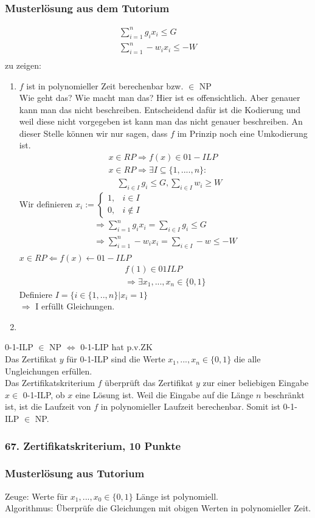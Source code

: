 \documentclass[ngerman,a4paper]{report}
\begin{document}
\subsubsection*{Musterlösung aus dem Tutorium}
\begin{align*}
\sum_{i=1}^n g_ix_i \leq G\\
\sum_{i=1}^n -w_ix_i \leq -W\\
\end{align*}
zu zeigen:
\begin{enumerate}
\item $f$ ist in polynomieller Zeit berechenbar bzw. $\in$ NP\\
Wie geht das? Wie macht man das? Hier ist es offensichtlich. Aber genauer kann man das nicht beschreiben. Entscheidend dafür ist die Kodierung und weil diese nicht vorgegeben ist kann man das nicht genauer beschreiben. An dieser Stelle können wir nur sagen, dass $f$ im Prinzip noch eine Umkodierung ist.\\
\begin{align*}
x \in RP \Rightarrow f(x) \in 01-ILP\\
x \in RP \Rightarrow \exists I \subseteq \{1,....,n\}:\\
\quad \sum_{i \in I} g_i \leq G, \sum_{i \in I} w_i \geq W
\end{align*}
Wir definieren $x_i := \begin{cases}1, &i \in I \\ 0, & i \notin I \end{cases}$
\begin{align*}
\Rightarrow \sum_{i=1}^n g_i x_i = \sum_{i \in I} g_i \leq G\\
\Rightarrow \sum_{i=1}^n -w_i x_i = \sum_{i \in I} -w \leq -W\\
\end{align*}
$x \in RP \Leftarrow f(x) \leftarrow 01-ILP$
\begin{align*}
f(1) \in 01ILP\\
\Rightarrow \exists x_1,...,x_n \in \{0,1\}
\end{align*}
Definiere $I = \{i\in \{1,..,n\}|x_i = 1\}$\\
$\Rightarrow$ I erfüllt Gleichungen.
\item 
\end{enumerate}

0-1-ILP $\in $ NP $\Leftrightarrow$ 0-1-LIP hat p.v.ZK\\

Das Zertifikat $y$ für 0-1-ILP sind die Werte $x_1,...,x_n \in \{0,1\}$ die alle Ungleichungen erfüllen.\\
Das Zertifikatskriterium $f$ überprüft das Zertifikat $y$ zur einer beliebigen Eingabe $x \in $ 0-1-ILP, ob $x$ eine Lösung ist. Weil die Eingabe auf die Länge $n$ beschränkt ist, ist die Laufzeit von $f$ in polynomieller Laufzeit berechenbar. Somit ist 0-1-ILP $\in$ NP.

\subsubsection*{67. Zertifikatskriterium, 10 Punkte}
\subsubsection*{Musterlösung aus Tutorium}
Zeuge: Werte für $x_1,...,x_0 \in \{0,1\}$ Länge ist polynomiell.\\
Algorithmus: Überprüfe die Gleichungen mit obigen Werten in polynomieller Zeit.\\
\end{document}
